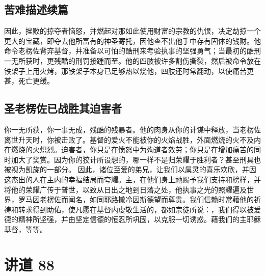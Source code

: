 
\subsection{苦难描述续篇}

因此，挫败的掠夺者恼怒，并燃起对那如此使用财富的宗教的仇恨，决定劫掠一个更大的宝藏，即夺去他所富有的神圣寄托，因他查不出他手中存有固体的钱财。他命令老楞佐背弃基督，并准备以可怕的酷刑来考验执事的坚强勇气；当最初的酷刑一无所获时，更残酷的刑罚接踵而至。他的四肢被许多割伤撕裂，然后被命令放在铁架子上用火烤，那铁架子本身已足够热以烧他，四肢还时常翻动，以使痛苦更甚，死亡更缓。\par


\subsection{圣老楞佐已战胜其迫害者}

你一无所获，你一事无成，残酷的残暴者。他的肉身从你的计谋中释放，当老楞佐离世升天时，你被击败了。基督的爱火不能被你的火焰战胜，外面燃烧的火不及内在燃烧的火炽烈。迫害者，你只是在愤怒中为殉道者效劳；你只是在增加痛苦的同时加大了奖赏。因为你的狡计所设想的，哪一样不是归荣耀于胜利者？甚至刑具也被视为凯旋的一部分。\newline{} 因此，诸位至爱的弟兄，让我们以属灵的喜乐欢欣，并因这杰出的人在主内的幸福结局而夸耀。主，在他们身上祂赐予我们支持和榜样，并将他的荣耀广传于普世，以致从日出之地到日落之处，他执事之光的照耀遍及世界，罗马因老楞佐而闻名，如同耶路撒冷因斯德望而尊贵。我们信赖时常藉他的祈祷和转求得到助佑，使凡愿在基督内虔敬生活的，都如宗徒所说：，我们得以被爱德的精神所坚强，并由坚定信德的恒忍所巩固，以克服一切诱惑。藉我们的主耶稣基督，等等。\par



\section{讲道 88}

